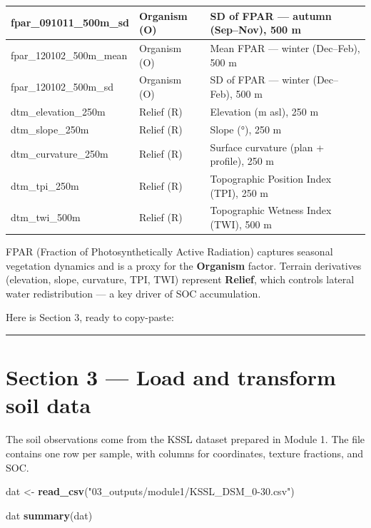 \documentclass[
  10pt,
  b5paper,
  oneside]{book}
\newenvironment{Shaded}{\begin{snugshade}}{\end{snugshade}}
\newcommand{\FunctionTok}[1]{\textcolor[rgb]{0.13,0.29,0.53}{\textbf{#1}}}
\newcommand{\NormalTok}[1]{#1}
\newcommand{\OtherTok}[1]{\textcolor[rgb]{0.56,0.35,0.01}{#1}}
\newcommand{\StringTok}[1]{\textcolor[rgb]{0.31,0.60,0.02}{#1}}
\begin{document}
\begin{tabular}{l|l|l}
\hline
fpar\_091011\_500m\_sd & Organism (O) & SD of FPAR — autumn (Sep–Nov), 500 m\\
\hline
fpar\_120102\_500m\_mean & Organism (O) & Mean FPAR — winter (Dec–Feb), 500 m\\
\hline
fpar\_120102\_500m\_sd & Organism (O) & SD of FPAR — winter (Dec–Feb), 500 m\\
\hline
dtm\_elevation\_250m & Relief (R) & Elevation (m asl), 250 m\\
\hline
dtm\_slope\_250m & Relief (R) & Slope (°), 250 m\\
\hline
dtm\_curvature\_250m & Relief (R) & Surface curvature (plan + profile), 250 m\\
\hline
dtm\_tpi\_250m & Relief (R) & Topographic Position Index (TPI), 250 m\\
\hline
dtm\_twi\_500m & Relief (R) & Topographic Wetness Index (TWI), 500 m\\
\hline
\end{tabular}

FPAR (Fraction of Photosynthetically Active Radiation) captures seasonal vegetation
dynamics and is a proxy for the \textbf{Organism} factor. Terrain derivatives (elevation,
slope, curvature, TPI, TWI) represent \textbf{Relief}, which controls lateral water
redistribution --- a key driver of SOC accumulation.

Here is Section 3, ready to copy-paste:

\begin{center}\rule{0.5\linewidth}{0.5pt}\end{center}

\section*{Section 3 --- Load and transform soil data}\label{section-3-load-and-transform-soil-data}

The soil observations come from the KSSL dataset prepared in Module 1. The file
contains one row per sample, with columns for coordinates, texture fractions, and SOC.

\begin{Shaded}
\begin{Highlighting}[]
\NormalTok{dat }\OtherTok{\textless{}{-}} \FunctionTok{read\_csv}\NormalTok{(}\StringTok{"03\_outputs/module1/KSSL\_DSM\_0{-}30.csv"}\NormalTok{)}

\NormalTok{dat}
\FunctionTok{summary}\NormalTok{(dat)}
\end{Highlighting}
\end{Shaded}
\end{document}
